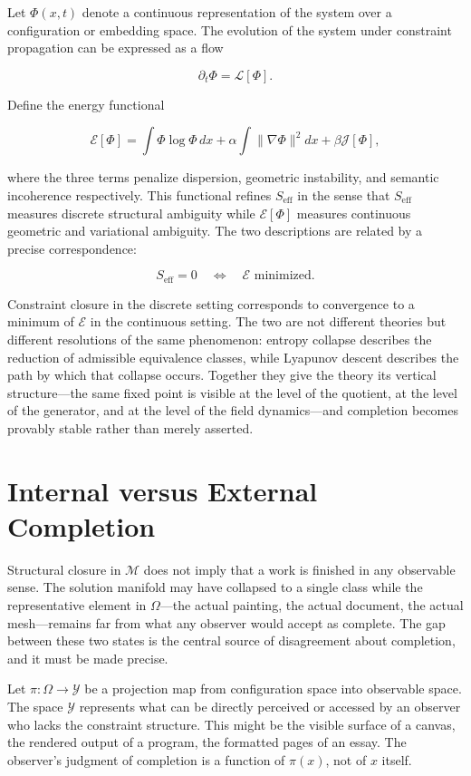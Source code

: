 \documentclass[11pt, twoside]{article}
\theoremstyle{plain}
\theoremstyle{definition}
\theoremstyle{remark}
\newcommand{\Seff}{S_{\text{eff}}}
\begin{document}
Let $\Phi(x,t)$ denote a continuous representation of the system over a configuration or embedding space. The evolution of the system under constraint propagation can be expressed as a flow

\[
\partial_t \Phi = \mathcal{L}[\Phi].
\]

Define the energy functional

\[
\mathcal{E}[\Phi] = \int \Phi \log \Phi \, dx + \alpha \int \|\nabla \Phi\|^2 dx + \beta \mathcal{J}[\Phi],
\]

where the three terms penalize dispersion, geometric instability, and semantic incoherence respectively. This functional refines $\Seff$ in the sense that $\Seff$ measures discrete structural ambiguity while $\mathcal{E}[\Phi]$ measures continuous geometric and variational ambiguity. The two descriptions are related by a precise correspondence:

\[
\Seff = 0 \quad \Longleftrightarrow \quad \mathcal{E} \text{ minimized}.
\]

Constraint closure in the discrete setting corresponds to convergence to a minimum of $\mathcal{E}$ in the continuous setting. The two are not different theories but different resolutions of the same phenomenon: entropy collapse describes the reduction of admissible equivalence classes, while Lyapunov descent describes the path by which that collapse occurs. Together they give the theory its vertical structure---the same fixed point is visible at the level of the quotient, at the level of the generator, and at the level of the field dynamics---and completion becomes provably stable rather than merely asserted.

\section{Internal versus External Completion}
\label{sec:internal-external}

Structural closure in $\mathcal{M}$ does not imply that a work is finished in any observable sense. The solution manifold may have collapsed to a single class while the representative element in $\Omega$---the actual painting, the actual document, the actual mesh---remains far from what any observer would accept as complete. The gap between these two states is the central source of disagreement about completion, and it must be made precise.

Let $\pi : \Omega \to \mathcal{Y}$ be a projection map from configuration space into observable space. The space $\mathcal{Y}$ represents what can be directly perceived or accessed by an observer who lacks the constraint structure. This might be the visible surface of a canvas, the rendered output of a program, the formatted pages of an essay. The observer's judgment of completion is a function of $\pi(x)$, not of $x$ itself.
\end{document}
